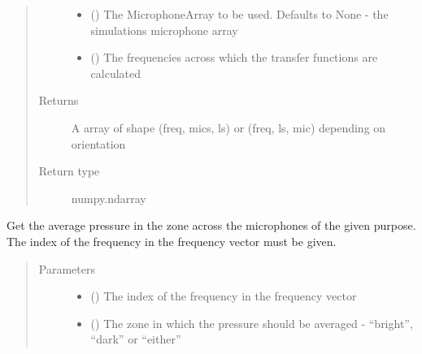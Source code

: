 \documentclass[letterpaper,10pt,english]{sphinxmanual}
\begin{document}
\begin{fulllineitems}
\begin{fulllineitems}
\begin{quote}
\begin{description}
\begin{itemize}
\item {} 
 ({\hyperref[\detokenize{source/pyzones:pyzones.MicrophoneArray}]{}}) \textendash{} The MicrophoneArray to be used. Defaults to None - the simulations microphone array

\item {} 
 () \textendash{} The frequencies across which the transfer functions are calculated

\end{itemize}

\item[{Returns}] \leavevmode
A array of shape (freq, mics, ls) or (freq, ls, mic) depending on orientation

\item[{Return type}] \leavevmode
numpy.ndarray

\end{description}\end{quote}

\end{fulllineitems}


\begin{fulllineitems}
\label{\detokenize{source/pyzones:pyzones.Simulation.get_avg_pa}}
Get the average pressure in the zone across the microphones of the given purpose. The index of the frequency in
the frequency vector must be given.
\begin{quote}\begin{description}
\item[{Parameters}] \leavevmode\begin{itemize}
\item {} 
 () \textendash{} The index of the frequency in the frequency vector

\item {} 
 () \textendash{} The zone in which the pressure should be averaged - “bright”, “dark” or “either”


\end{itemize}
\end{description}
\end{quote}
\end{fulllineitems}
\end{fulllineitems}
\end{document}
